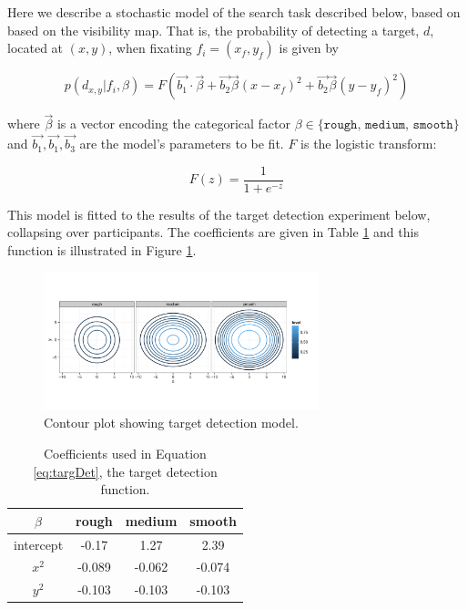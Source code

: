 \documentclass[man]{apa6}
\begin{document}
Here we describe a stochastic model of the search task described below, based on based on the visibility map. That is, the probability of detecting a target, $d$, located at $(x,y)$, when fixating $f_i = (x_f,y_f)$ is given by

\begin{equation}
 p(d_{x,y}|f_i,\beta) = F(\vec{b_1}\cdot\vec{\beta} + \vec{b_2}\vec{\beta} (x-x_f)^2 + \vec{b_2}\vec{\beta}(y-y_f)^2)
 \label{eq:targDet}
\end{equation} 

where $\vec{\beta}$ is a vector encoding the categorical factor $\beta \in \{\texttt{rough, medium, smooth}\}$ and $\vec{b_1},\vec{b_1},\vec{b_3}$ are the model's parameters to be fit.  $F$ is the logistic transform:

\begin{equation}
F(z)= \frac{1}{1+e^{-z}}
\end{equation}

This model is fitted to the results of the target detection experiment below, collapsing over participants. The coefficients are given in Table \ref{tab:targdetcoef} and this function is illustrated in Figure \ref{fig:targDet}.

\begin{figure}
	\centering
	\includegraphics[width=8cm]{fig/targDet/aggtargdet2.pdf}
	\caption{Contour plot showing target detection model.} 
	\label{fig:targDet}
\end{figure}

\begin{table}
\centering
\begin{tabular}{c|ccc}
 $\beta$ 	& rough & medium & smooth \\
\hline
intercept	& -0.17 & 1.27 & 2.39\\
$x^2$	& -0.089 & -0.062 & -0.074 \\
$y^2$	& -0.103 & -0.103 & -0.103 \\
\end{tabular}
\caption{Coefficients used in Equation \ref{eq:targDet}, the target detection function.}
\label{tab:targdetcoef}
\end{table}
\end{document}
